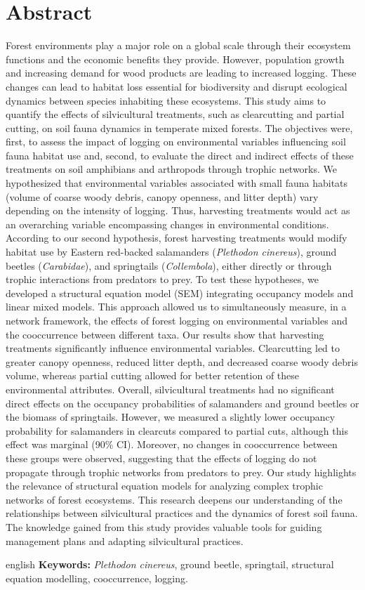 \chapter*{Abstract}             %
\label{chap-abstract}           %

Forest environments play a major role on a global scale through their ecosystem functions and the economic benefits they provide. 
However, population growth and increasing demand for wood products are leading to increased logging. 
These changes can lead to habitat loss essential for biodiversity and disrupt ecological dynamics between species inhabiting these ecosystems. 
This study aims to quantify the effects of silvicultural treatments, such as clearcutting and partial cutting, on soil fauna dynamics in temperate mixed forests. 
The objectives were, first, to assess the impact of logging on environmental variables influencing soil fauna habitat use and, second, 
to evaluate the direct and indirect effects of these treatments on soil amphibians and arthropods through trophic networks. 
We hypothesized that environmental variables associated with small fauna habitats (volume of coarse woody debris, canopy openness, and litter depth) vary depending on the intensity of logging. 
Thus, harvesting treatments would act as an overarching variable encompassing changes in environmental conditions. 
According to our second hypothesis, forest harvesting treatments would modify habitat use by Eastern red-backed salamanders (\textit{Plethodon cinereus}), ground beetles (\textit{Carabidae}), and springtails (\textit{Collembola}), 
either directly or through trophic interactions from predators to prey. 
To test these hypotheses, we developed a structural equation model (SEM) integrating occupancy models and linear mixed models. 
This approach allowed us to simultaneously measure, in a network framework, the effects of forest logging on environmental variables and the cooccurrence between different taxa. 
Our results show that harvesting treatments significantly influence environmental variables. 
Clearcutting led to greater canopy openness, reduced litter depth, and decreased coarse woody debris volume,  
whereas partial cutting allowed for better retention of these environmental attributes. 
Overall, silvicultural treatments had no significant direct effects on the occupancy probabilities of salamanders and ground beetles or the biomass of springtails. 
However, we measured a slightly lower occupancy probability for salamanders in clearcuts compared to partial cuts, although this effect was marginal (90\% CI). 
Moreover, no changes in cooccurrence between these groups were observed, suggesting that the effects of logging do not propagate through trophic networks from predators to prey. 
Our study highlights the relevance of structural equation models for analyzing complex trophic networks of forest ecosystems. 
This research deepens our understanding of the relationships between silvicultural practices and the dynamics of forest soil fauna. 
The knowledge gained from this study provides valuable tools for guiding management plans and adapting silvicultural practices. 

\begin{otherlanguage*}{english}
  \textbf{Keywords:} \textit{Plethodon cinereus}, ground beetle, springtail, structural equation modelling, cooccurrence, logging.
  
\end{otherlanguage*}
